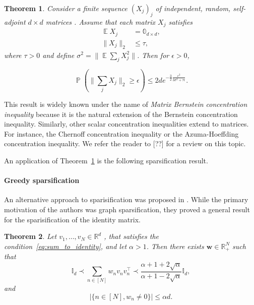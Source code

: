 \documentclass[twoside,11pt]{book}
\newtheorem{theorem}{Theorem}
\numberwithin{theorem}{chapter}
\numberwithin{definition}{chapter}
\numberwithin{proposition}{chapter}
\numberwithin{corollary}{chapter}
\numberwithin{example}{chapter}
\numberwithin{lemma}{chapter}
\numberwithin{assumption}{chapter}
\DeclareMathOperator{\Tran}{\intercal}
\DeclareMathOperator{\EX}{\mathbb{E}}
\DeclareMathOperator{\Prb}{\mathbb{P}}
\begin{document}
\begin{theorem}\label{thm:matrix_bernstein}
Consider a finite sequence $(X_{j})_{j}$ of independent, random, self-adjoint $d\times d$ matrices . Assume that each matrix $X_{j}$
satisfies 
\begin{align}
 \EX X_{j} &= \mathbb{0}_{d \times d},\\
 \|X_{j}\|_{2} &\leq \tau,
\end{align}
where $\tau >0$ and define $\sigma^{2} = \|\EX \sum\limits_{j} X_{j}^{2}\|$.
 Then for $\epsilon >0$, 

\begin{equation}
\Prb \left( \|\sum\limits_{j} X_{j}\|_{2} \geq \epsilon \right) \leq 2 d e^{-\frac{3}{2} \frac{\epsilon^{2}}{3\sigma^{2} + \tau \epsilon}}.
\end{equation}

\end{theorem}

This result is widely known under the name of \emph{Matrix Bernstein concentration inequality} because it is the natural extension of the Bernstein concentration inequality. Similarly, other scalar concentration inequalities extend to matrices. For instance, the Chernoff concentration inequality or the Azuma-Hoeffding concentration inequality. We refer the reader to [??] for a review on this topic. 



An application of Theorem~\ref{thm:matrix_bernstein} is the following sparsification result.


\paragraph{Greedy sparsification}
An alternative approach to sparisification was proposed in \citep*{BaSpSr12}. While the primary motivation of the authors was graph sparsification, they proved a general result for the sparisification of the identity matrix.
\begin{theorem}\citep*{BaSpSr12}
Let $v_{1}, \dots, v_{N} \in \mathbb{R}^{d}$ , that satisfies the condition~\eqref{eq:sum_to_identity}, and let $\alpha >1$. Then there exists $\bm{w} \in \mathbb{R}_{+}^{N}$ such that
\begin{equation}
\mathbb{I}_{d} \prec \sum\limits_{n \in [N]}w_{n}v_{n}v_{n}^{\Tran} \prec \frac{\alpha +1 +2\sqrt{\alpha}}{\alpha +1 -2\sqrt{\alpha}} \mathbb{I}_{d},
\end{equation}
and
\begin{equation}
|\{n \in [N], w_{n} \neq 0\}| \leq \alpha d.
\end{equation}
\end{theorem}
\end{document}
